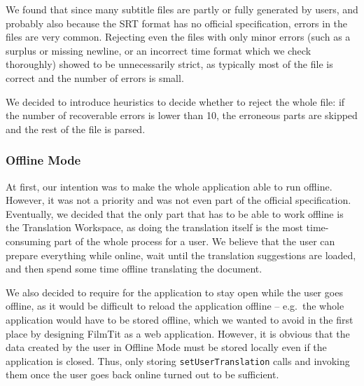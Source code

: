 We found that since many subtitle files are partly or fully generated by users, and probably also because the SRT format has no official specification, errors in the files are very common. Rejecting even the files with only minor errors (such as a surplus or missing newline, or an incorrect time format which we check thoroughly) showed to be unnecessarily strict, as typically most of the file is correct and the number of errors is small.

We decided to introduce heuristics to decide whether to reject the whole file: if the number of recoverable errors is lower than 10, the erroneous parts are skipped and the rest of the file is parsed.



\subsubsection{Offline Mode}
\label{ip:subsubsec:offline}

At first, our intention was to make the whole application able to run offline. However, it was not a priority and was not even part of the official specification.
Eventually, we decided that the only part that has to be able to work offline is the Translation Workspace, as doing the translation itself is the most time-consuming part of the whole process for a user. We believe that the user can prepare everything while online, wait until the translation suggestions are loaded, and then spend some time offline translating the document.

We also decided to require for the application to stay open while the user goes offline, as it would be difficult to reload the application offline
-- e.g.\ the whole application would have to be stored offline, which we wanted to avoid in the first place by designing FilmTit as a web application.
However, it is obvious that the data created by the user in Offline Mode must be stored locally even if the application is closed.
Thus, only storing {\tt setUserTranslation} calls and invoking them once the user goes back online turned out to be sufficient.


